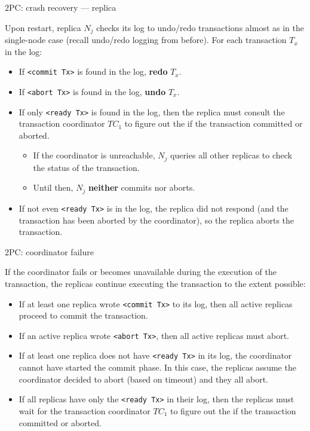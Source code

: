\begin{frame}{2PC: crash recovery --- replica}

Upon restart, replica $N_j$ checks its log to undo/redo transactions almost as in the single-node case (recall undo/redo logging from before). For each transaction $T_x$ in the log:

\begin{itemize}[-,noitemsep,topsep=-5pt]
\item If \lstinline[style=cmput391]!<commit Tx>! is found in the log, \textbf{redo} $T_x$.
\item If \lstinline[style=cmput391]!<abort Tx>! is found in the log, \textbf{undo} $T_x$.
\item If only \lstinline[style=cmput391]!<ready Tx>! is found in the log, then the replica must \alert{consult the transaction coordinator} $\mathit{TC}_1$ to figure out the if the transaction committed or aborted.
\begin{itemize}[-,topsep=-10pt]
\item If the coordinator is unreachable, $N_j$ queries all other replicas to check the status of the transaction.
\item Until then, $N_j$ \textbf{neither} commits nor aborts.
\end{itemize}
\item If not even \lstinline[style=cmput391]!<ready Tx>! is in the log, the replica did not respond (and the transaction has been aborted by the coordinator), so the replica aborts the transaction.
\end{itemize}
\end{frame}

%
%

\begin{frame}{2PC: coordinator failure}

If the coordinator fails or becomes unavailable during the execution of the transaction, the replicas continue executing the transaction to the extent possible:
\begin{itemize}[-,noitemsep,topsep=-5pt]
\item If at least one replica wrote \lstinline[style=cmput391]!<commit Tx>! to its log, then all active replicas proceed to commit the transaction.
\item If an active replica wrote \lstinline[style=cmput391]!<abort Tx>!, then all active replicas must abort.
\item If at least one replica \alert{does not} have \lstinline[style=cmput391]!<ready Tx>! in its log, the coordinator cannot have started the commit phase. In this case, the replicas assume the coordinator decided to abort (based on timeout) and they all abort.
\item If all replicas have only the \lstinline[style=cmput391]!<ready Tx>! in their log, then the replicas must \alert{wait for the transaction coordinator} $\mathit{TC}_1$ to figure out the if the transaction committed or aborted.
\end{itemize}
\end{frame}

